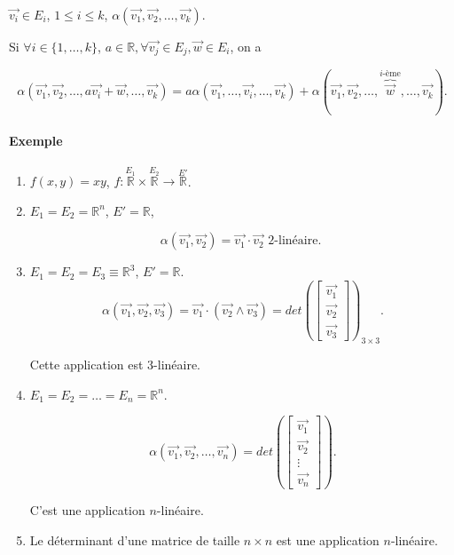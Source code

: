 \documentclass[french]{article}
\theoremstyle{definition}
\theoremstyle{remark}
\begin{document}
$\overrightarrow{ v_i } \in E_i $, $1 \leq i \leq k$, $\alpha(\overrightarrow{ v_1 }, \overrightarrow{ v_2 }, \dots, \overrightarrow{ v_k })$.

Si $\forall i \in \{ 1, \dots, k \}$, $a \in \mathbb{R}, \forall \overrightarrow{ v_j } \in E_j, \overrightarrow{ w } \in E_i $, on a

\[
\alpha(\overrightarrow{ v_1 }, \overrightarrow{ v_2 }, \dots, a \overrightarrow{ v_i }+ \overrightarrow{ w }, \dots, \overrightarrow{ v_k }) = a \alpha(\overrightarrow{ v_1 }, \dots, \overrightarrow{ v_i }, \dots, \overrightarrow{ v_k })+ \alpha(\overrightarrow{ v_1 }, \overrightarrow{ v_2 }, \dots, \overbrace{\overrightarrow{ w } }^{i\text{-ème}}, \dots, \overrightarrow{ v_k }).
\]

\paragraph{Exemple}

\begin{enumerate}
  \item $f(x,y) = xy$, $f : \stackrel{E_1}{\mathbb{R}} \times \stackrel{E_2}{\mathbb{R}} \to \stackrel{E'}{\mathbb{R}}$.
  \item $E_1 = E_2 = \mathbb{R}^n$, $E' = \mathbb{R}$,

  \[
  \alpha(\overrightarrow{ v_1 }, \overrightarrow{ v_2 } ) = \overrightarrow{ v_1 }\cdot \overrightarrow{ v_2 } \text{ 2-linéaire. }
  \]

  \item $E_1 = E_2 = E_3 \equiv \mathbb{R}^3$, $E' = \mathbb{R}$.
  \[
  \alpha(\overrightarrow{ v_1 }, \overrightarrow{ v_2 }, \overrightarrow{ v_3 }) = \overrightarrow{ v_1 } \cdot (\overrightarrow{ v_2 } \wedge \overrightarrow{ v_3 }  ) = det \left( \left[\begin{matrix}
  \overrightarrow{ v_1 } \\
  \overrightarrow{ v_2 }  \\
  \overrightarrow{ v_3 }
  \end{matrix}\right]\right)  _{3 \times 3}.
  \]

  Cette application est 3-linéaire.

  \item $E_1 = E_2 = \dots = E_n = \mathbb{R}^n$.

  \[
  \alpha(\overrightarrow{ v_1 }, \overrightarrow{ v_2 }, \dots, \overrightarrow{ v_n } ) = det \left(\left[\begin{matrix}
  \overrightarrow{ v_1 } \\
  \overrightarrow{ v_2 } \\
  \vdots \\
  \overrightarrow{ v_n }
  \end{matrix}\right]\right).
  \]

  C'est une application $n$-linéaire.

  \item Le déterminant d'une matrice de taille $n \times n$ est une application $n$-linéaire.
\end{enumerate}
\end{document}
